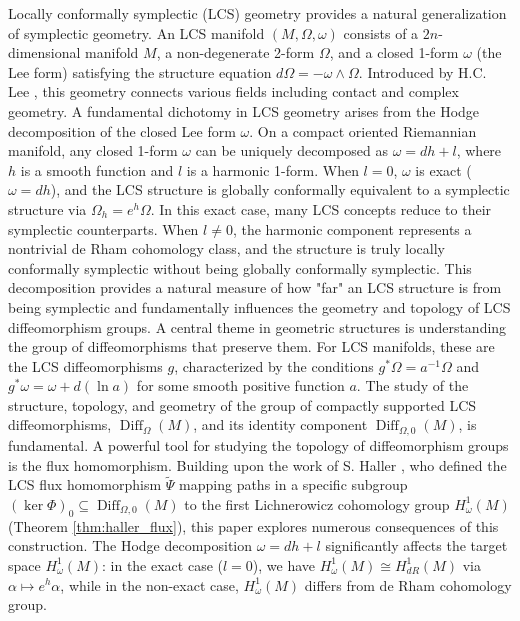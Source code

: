 \documentclass[11pt,a4paper]{amsart}
\theoremstyle{definition}
\theoremstyle{remark}
\newcommand{\Diff}{\operatorname{Diff}}
\begin{document}
	Locally conformally symplectic (LCS) geometry provides a natural generalization of symplectic geometry. An LCS manifold $(M, \Omega, \omega)$ consists of a $2n$-dimensional manifold $M$, a non-degenerate 2-form $\Omega$, and a closed 1-form $\omega$ (the Lee form) satisfying the structure equation $d\Omega = -\omega \wedge \Omega$. Introduced by H.C. Lee \cite{Lee1943}, this geometry connects various fields including contact and complex geometry. A fundamental dichotomy in LCS geometry arises from the Hodge decomposition of the closed Lee form $\omega$. On a compact oriented Riemannian manifold, any closed 1-form $\omega$ can be uniquely decomposed as $\omega = dh + l$, where $h$ is a smooth function and $l$ is a harmonic 1-form. When $l = 0$, $\omega$ is exact ($\omega = dh$), and the LCS structure is globally conformally equivalent to a symplectic structure via $\Omega_h = e^h\Omega$. In this exact case, many LCS concepts reduce to their symplectic counterparts. When $l \neq 0$, the harmonic component represents a nontrivial de Rham cohomology class, and the structure is truly locally conformally symplectic without being globally conformally symplectic. This decomposition provides a natural measure of how "far" an LCS structure is from being symplectic and fundamentally influences the geometry and topology of LCS diffeomorphism groups. A central theme in geometric structures is understanding the group of diffeomorphisms that preserve them. For LCS manifolds, these are the LCS diffeomorphisms $g$, characterized by the conditions $g^*\Omega = a^{-1}\Omega$ and $g^*\omega = \omega + d(\ln a)$ for some smooth positive function $a$. The study of the structure, topology, and geometry of the group of compactly supported LCS diffeomorphisms, $\Diff_\Omega(M)$, and its identity component $\Diff_{\Omega,0}(M)$, is fundamental.	A powerful tool for studying the topology of diffeomorphism groups is the flux homomorphism. Building upon the work of S. Haller \cite{Haller2005}, who defined the LCS flux homomorphism $\widetilde{\Psi}$ mapping paths in a specific subgroup $(\ker \Phi)_0 \subseteq \Diff_{\Omega,0}(M)$ to the first Lichnerowicz cohomology group $H_\omega^1(M)$ (Theorem \ref{thm:haller_flux}), this paper explores numerous consequences of this construction. The Hodge decomposition $\omega = dh + l$ significantly affects the target space $H_\omega^1(M)$: in the exact case ($l=0$), we have $H_\omega^1(M) \cong H_{dR}^1(M)$ via $\alpha \mapsto e^h\alpha$, while in the non-exact case, $H_\omega^1(M)$ differs from de Rham cohomology group.\\
	
\end{document}
